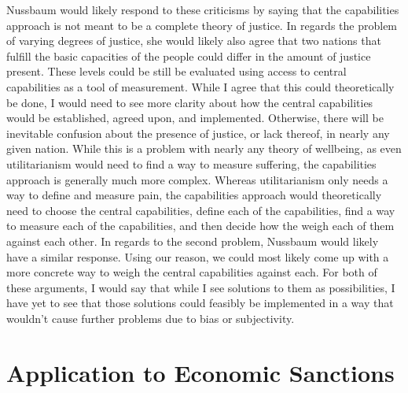 \documentclass[12pt]{article}
\begin{document}
Nussbaum would likely respond to these criticisms by saying that the capabilities approach is not meant to be a complete theory of justice.
In regards the problem of varying degrees of justice, she would likely also agree that two nations that fulfill the basic capacities of the people could differ in the amount of justice present.
These levels could be still be evaluated using access to central capabilities as a tool of measurement.
While I agree that this could theoretically be done, I would need to see more clarity about how the central capabilities would be established, agreed upon, and implemented.
Otherwise, there will be inevitable confusion about the presence of justice, or lack thereof, in nearly any given nation.
While this is a problem with nearly any theory of wellbeing, as even utilitarianism would need to find a way to measure suffering, the capabilities approach is generally much more complex.
Whereas utilitarianism only needs a way to define and measure pain, the capabilities approach would theoretically need to choose the central capabilities, define each of the capabilities, find a way to measure each of the capabilities, and then decide how the weigh each of them against each other.
In regards to the second problem, Nussbaum would likely have a similar response.
Using our reason, we could most likely come up with a more concrete way to weigh the central capabilities against each.
For both of these arguments, I would say that while I see solutions to them as possibilities, I have yet to see that those solutions could feasibly be implemented in a way that wouldn't cause further problems due to bias or subjectivity.

\section*{Application to Economic Sanctions}
\end{document}
